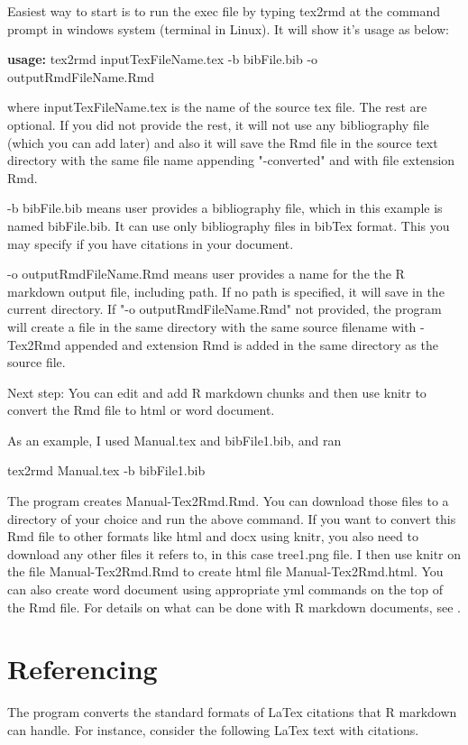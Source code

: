 \documentclass[12pt,svgnames]{article}
\begin{document}
Easiest way to start is to run the exec file by typing tex2rmd at the command prompt in windows system (terminal in Linux).  It will show it's usage as below:

\textbf{usage:} tex2rmd inputTexFileName.tex -b bibFile.bib -o outputRmdFileName.Rmd 

where inputTexFileName.tex is the name of the source tex file. The rest are optional. If you did not provide the rest, it will not use any bibliography file (which you can add later) and also it will save the Rmd file in the source text directory with the same file name appending "-converted" and with file extension Rmd.  

-b bibFile.bib means user provides a bibliography file, which in this example is named bibFile.bib.  It can use only bibliography files in bibTex format. This you may specify if you have citations in your document.

-o outputRmdFileName.Rmd means user provides a name for the the R markdown output file, including path. If no path is specified, it will save in the current directory. If "-o outputRmdFileName.Rmd" not provided, the program will create a file in the same directory with the same source filename with -Tex2Rmd appended and extension Rmd is added in the same directory as the source file.

Next step: You can edit and add R markdown chunks and then use knitr to convert the Rmd file to html or word document.  

As an example, I used Manual.tex and bibFile1.bib, and ran  

tex2rmd Manual.tex -b bibFile1.bib  

The program creates Manual-Tex2Rmd.Rmd. You can download those files to a directory of your choice and run the above command.  If you want to convert this Rmd file to other formats like html and docx using knitr, you also need to download any other files it refers to, in this case tree1.png file. I then use knitr on the file Manual-Tex2Rmd.Rmd to create html file Manual-Tex2Rmd.html. You can also create word document using appropriate yml commands on the top of the Rmd file. For details on what can be done with R markdown documents, see \cite{Xie.Riederer_2020}.

\section {Referencing}\label{sec3}
The program converts  the standard formats of LaTex citations that R markdown can handle.  For instance, consider the following LaTex text with citations.
\end{document}
